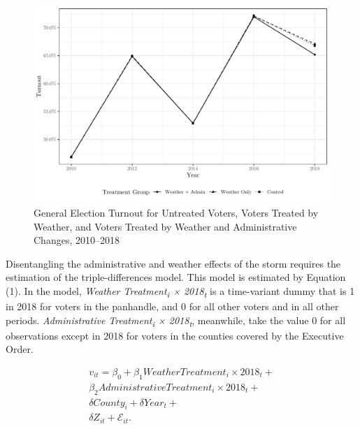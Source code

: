 \documentclass[
  12pt,
]{article}
\begin{document}
\begin{figure}[h]

{\centering \includegraphics{hurricane_michael_files/figure-latex/tripd-to-chunk-1} 

}

\caption{\label{fig:trip-diff-plot}General Election Turnout for Untreated Voters, Voters Treated by Weather, and Voters Treated by Weather and Administrative Changes, 2010--2018}\label{fig:tripd-to-chunk}
\end{figure}

Disentangling the administrative and weather effects of the storm requires the estimation of the triple-differences model. This model is estimated by Equation (1). In the model, \emph{Weather Treatment\textsubscript{i} × 2018\textsubscript{t}} is a time-variant dummy that is 1 in 2018 for voters in the panhandle, and 0 for all other voters and in all other periods. \emph{Administrative Treatment\textsubscript{i} × 2018\textsubscript{t}}, meanwhile, take the value 0 for all observations except in 2018 for voters in the counties covered by the Executive Order.

\begin{gather}
\label{eq:1}
v_{it}=\beta_0 + \beta_1Weather Treatment_{i}\times 2018_{t} + \\ 
\beta_2Administrative Treatment_{i}\times 2018_{t} + \nonumber \\
\delta{County}_{i} + \delta{Year}_{t} + \nonumber \\
\delta{Z}_{it} + \mathcal{E}_{it}. \nonumber
\end{gather}
\end{document}
